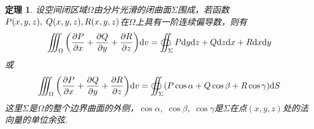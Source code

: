 \documentclass[12pt, a4paper, oneside]{ctexbook}
\newtheorem{theorem}{定理}[section]  %
\def\d{\textup{d}} %
\def\d{\textup{d}} %
\begin{document}
        \begin{tcolorbox}[
            title=\textbf{\textcolor{white}{Theorem}},
            colback=Emerald!10,
            colframe=cyan!40!black]

            \begin{theorem}
                设空间闭区域$\Omega$由分片光滑的闭曲面$\Sigma$围成，若函数$P(x,y,z),\;Q(x,y,z) \\ ,R(x,y,z)$在$\Omega$上具有一阶连续偏导数，则有
                \begin{equation}
                    \iiint_{\Omega} \bigg(\frac{\partial P}{\partial x}+\frac{\partial Q}{\partial y}+\frac{\partial R}{\partial z} \bigg)\d v = \oiint_{\Sigma}P\d y\d z+Q\d z\d x+R\d x\d y
                \end{equation}
                或
                \begin{equation}
                    \iiint_{\Omega} \bigg(\frac{\partial P}{\partial x}+\frac{\partial Q}{\partial y}+\frac{\partial R}{\partial z} \bigg)\d v = \oiint_{\Sigma}(P\cos\alpha+Q\cos\beta+R\cos\gamma)\d S
                \end{equation}
                这里$\Sigma$是$\Omega$的整个边界曲面的外侧，$\cos\alpha,\;\cos\beta,\;\cos\gamma$是$\Sigma$在点$(x,y,z)$处的法向量的单位余弦.
            \end{theorem}

        \end{tcolorbox}
\end{document}
